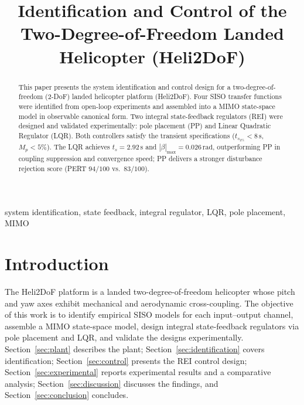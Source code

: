 \documentclass[conference]{IEEEtran}
\begin{document}
\title{Identification and Control of the Two-Degree-of-Freedom Landed Helicopter (Heli2DoF)}

\author{
}

\maketitle

\begin{abstract}
This paper presents the system identification and control design for a two-degree-of-freedom (2-DoF) landed helicopter platform (Heli2DoF). Four SISO transfer functions were identified from open-loop experiments and assembled into a MIMO state-space model in observable canonical form. Two integral state-feedback regulators (REI) were designed and validated experimentally: pole placement (PP) and Linear Quadratic Regulator (LQR). Both controllers satisfy the transient specifications ($t_{s_{2\%}} < 8\,\text{s}$, $M_p < 5\%$). The LQR achieves $t_s = 2.92\,\text{s}$ and $|\beta|_{\max} = 0.026\,\text{rad}$, outperforming PP in coupling suppression and convergence speed; PP delivers a stronger disturbance rejection score (PERT $94/100$ vs.\ $83/100$).
\end{abstract}

\begin{IEEEkeywords}
system identification, state feedback, integral regulator, LQR, pole placement, MIMO
\end{IEEEkeywords}

\section{Introduction}

The Heli2DoF platform is a landed two-degree-of-freedom helicopter whose pitch and yaw axes exhibit mechanical and aerodynamic cross-coupling. The objective of this work is to identify empirical SISO models for each input--output channel, assemble a MIMO state-space model, design integral state-feedback regulators via pole placement and LQR, and validate the designs experimentally. Section~\ref{sec:plant} describes the plant; Section~\ref{sec:identification} covers identification; Section~\ref{sec:control} presents the REI control design; Section~\ref{sec:experimental} reports experimental results and a comparative analysis; Section~\ref{sec:discussion} discusses the findings, and Section~\ref{sec:conclusion} concludes.
\end{document}
